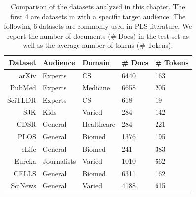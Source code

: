 \begin{table}[t]
\setlength{\tabcolsep}{3pt}
\centering \footnotesize
\begin{tabular}{r|lll l}
\textbf{Dataset} & \textbf{Audience} & \textbf{Domain} & \textbf{\# Docs} & \textbf{\# Tokens} \\ \hline
arXiv & Experts & CS &6440 & 163 \\
PubMed & Experts & Medicine &6658 & 205 \\
SciTLDR & Experts & CS &618 & 19 \\
SJK & Kids & Varied & 284  & 142 \\ \hdashline[0.5pt/3pt]
CDSR & General & Healthcare &284 & 221 \\
PLOS & General & Biomed &1376 & 195 \\
eLife & General & Biomed &241 & 383 \\
Eureka & Journalists & Varied &1010 & 662 \\
CELLS & General & Biomed &6311 & 162 \\
SciNews & General &  Varied & 4188 & 615 
\end{tabular}
\caption{Comparison of the datasets analyzed in this chapter. The first 4 are datasets in with a specific target audience. The following 6 datasets are commonly used in PLS literature. We report the number of documents (\# Docs) in the test set as well as the average number of tokens (\# Tokens).
}\label{tab:dataset-comp}
\end{table}